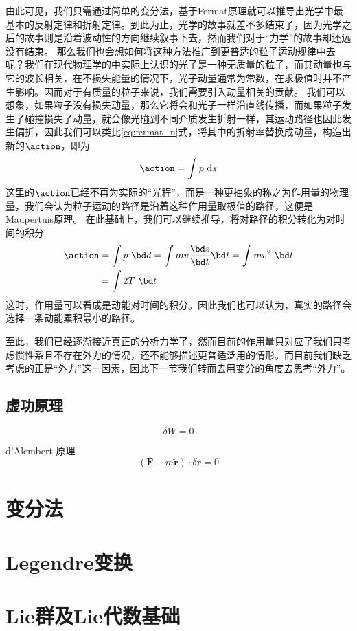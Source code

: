 \documentclass[12pt,openany]{book}
\begin{document}
由此可见，我们只需通过简单的变分法，基于Fermat原理就可以推导出光学中最基本的反射定律和折射定律。到此为止，光学的故事就差不多结束了，因为光学之后的故事则是沿着波动性的方向继续叙事下去，然而我们对于“力学”的故事却还远没有结束。
那么我们也会想如何将这种方法推广到更普适的粒子运动规律中去呢？我们在现代物理学的中实际上认识的光子是一种无质量的粒子，而其动量也与它的波长相关，在不损失能量的情况下，光子动量通常为常数，在求极值时并不产生影响。因而对于有质量的粒子来说，我们需要引入动量相关的贡献。
我们可以想象，如果粒子没有损失动量，那么它将会和光子一样沿直线传播，而如果粒子发生了碰撞损失了动量，就会像光碰到不同介质发生折射一样，其运动路径也因此发生偏折，因此我们可以类比\eqref{eq:fermat_n}式，将其中的折射率替换成动量，构造出新的$\action$，即为
\begin{equation}
   \action =\int p~\mathrm{d}s
\end{equation}
这里的$\action$已经不再为实际的“光程”，而是一种更抽象的称之为作用量的物理量，我们会认为粒子运动的路径是沿着这种作用量取极值的路径，这便是Maupertuis原理。
在此基础上，我们可以继续推导，将对路径的积分转化为对时间的积分
\begin{equation}
   \begin{split}
   \action &= \int p~\bd d = \int mv \frac{\bd s}{\bd t}\bd t = \int mv^2 ~\bd t\\&=\int 2 T~\bd t
   \end{split}
\end{equation}
这时，作用量可以看成是动能对时间的积分。因此我们也可以认为，真实的路径会选择一条动能累积最小的路径。

至此，我们已经逐渐接近真正的分析力学了，然而目前的作用量只对应了我们只考虑惯性系且不存在外力的情况，还不能够描述更普适泛用的情形。而目前我们缺乏考虑的正是“外力”这一因素，因此下一节我们转而去用变分的角度去思考“外力”。

\section{虚功原理}

\begin{equation}
   \delta W = 0
\end{equation}

d'Alembert 原理
\begin{equation}
   (\boldsymbol{F} - m\ddot{\boldsymbol{r}})\cdot\delta\boldsymbol{r}=0
\end{equation}





\backmatter



\appendix
\chapter{变分法}
\label{sec:variation}
\chapter{Legendre变换}
\label{sec:legendre}
\chapter{Lie群及Lie代数基础}
\label{sec:lie}
\end{document}
